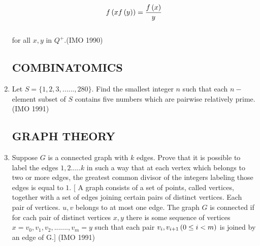 \begin{enumerate}
			\begin{align*}  f\left(xf\left(y\right)\right)= \frac{f\left(x\right)}{y} \end{align*}\\ for all $x , y$ in $Q^+$.\hfill(IMO 1990)


      \subsection*{COMBINATOMICS}

  \item Let $S = \{1,2,3,......,280\}$. Find the smallest integer $n$ such that each $n-$ element subset of $S$ contains five numbers which are pairwise relatively prime.\hfill(IMO 1991)

	  \subsection*{GRAPH THEORY}

  \item Suppose $G$ is a connected graph with $k$ edges. Prove that it is possible to label the edges $1,2.....k$ in such a way that at each vertex which belongs to two or more edges, the greatest common divisor of the integers labeling those edges is equal to $1$.
	  $[$ A graph consists of a set of points, called vertices, together with a set of edges joining certain pairs of distinct vertices. Each pair of vertices. $u, v$ belongs to at most one edge. The graph $G$ is connected if for cach pair of distinct vertices $x, y$ there is some sequence of vertices   $x=v_0,v_1,v_2,.......,v_m = y$  such that each pair $v_i,v_{i+1}\left(0\leq i < m\right)$ is joined by an edge of G$.]$ \hfill(IMO 1991)
\end{enumerate}
